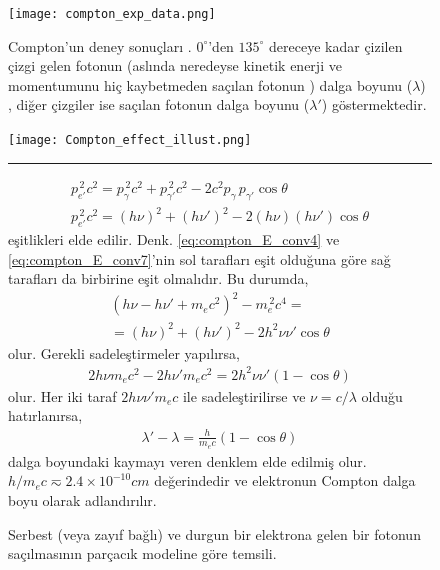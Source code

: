 \documentclass[a4paper,12pt, twoside]{article}
\begin{document}
\begin{figure}[hbtp]
\begin{minipage}{0.45\textwidth}
{\center
\texttt{[image: compton\_exp\_data.png]}
\caption{Compton'un deney sonuçları \cite{Compton1923, book:EisbergResnick, web:hyperphysics_compton}. $0^\circ$'den $135^\circ$ dereceye kadar çizilen çizgi gelen fotonun (aslında neredeyse kinetik enerji ve momentumunu hiç kaybetmeden saçılan fotonun \cite{web:hyperphysics_compton}) dalga boyunu ($\lambda$) , diğer çizgiler ise saçılan fotonun dalga boyunu ($\lambda'$) göstermektedir.}
\label{fig:compton_exp}}
\end{minipage}
\hspace{12pt}
\begin{minipage}{0.54\textwidth}
{\center
\texttt{[image: Compton\_effect\_illust.png]}
\caption{Serbest (veya zayıf bağlı) ve durgun bir elektrona gelen bir fotonun saçılmasının parçacık modeline göre temsili.}
\label{fig:compton_duzenek}}

\vspace{12pt}

\noindent\rule{.98\textwidth}{0.4pt}
\begin{align}
\label{eq:compton_E_conv7}
p_{e'}^{\, 2}c^2 = p_{\gamma}^{\, 2}c^2 + p_{\gamma'}^{\, 2}c^2 - 2c^2 p_{\gamma}\, p_{\gamma'} \cos\theta \nonumber \\
p_{e'}^{\, 2}c^2 = (h \nu)^2 + (h \nu')^2 - 2(h\nu)(h \nu')\cos{\theta}
\end{align}
eşitlikleri elde edilir. Denk. \ref{eq:compton_E_conv4} ve  \ref{eq:compton_E_conv7}'nin sol tarafları eşit olduğuna göre sağ tarafları da birbirine eşit olmalıdır. Bu durumda,
\begin{align}
\label{eq:compton_E_conv8}
(h\nu - h\nu' + m_e c^2)^2 - m_e^{\, 2}c^4 = \nonumber\\
= \left(h\nu\right)^2 + \left(h \nu'\right)^2 - 2h^2 \nu\nu'\cos{\theta}
\end{align}
olur. Gerekli sadeleştirmeler yapılırsa,
\begin{align}
\label{eq:compton_E_conv9}
2 h \nu m_e c^2-2 h \nu' m_e c^2   = 2 h^2 \nu \nu' \left( 1 - \cos \theta \right)
\end{align}
olur. Her iki taraf $ 2h\nu\nu'm_e c$ ile sadeleştirilirse ve $\nu = c/\lambda$ olduğu hatırlanırsa,
\begin{align}
\label{eq:compton_E_conv10}
\lambda'-\lambda = \frac{h}{m_ec}(1-\cos{\theta})
\end{align}
dalga boyundaki kaymayı veren denklem elde edilmiş olur. $h/m_e c \eqsim 2.4\times10^{-10} cm$ değerindedir ve elektronun Compton dalga boyu olarak adlandırılır.

\end{minipage}
\end{figure}
\end{document}
